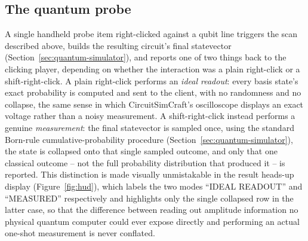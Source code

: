 \subsection{The quantum probe}

A single handheld probe item right-clicked against a qubit line triggers the scan described
above, builds the resulting circuit's final statevector (Section~\ref{sec:quantum-simulator}),
and reports one of two things back to the clicking player, depending on whether the
interaction was a plain right-click or a shift-right-click. A plain right-click performs an
\emph{ideal readout}: every basis state's exact probability is computed and sent to the
client, with no randomness and no collapse, the same sense in which CircuitSimCraft's
oscilloscope displays an exact voltage rather than a noisy measurement. A shift-right-click
instead performs a genuine \emph{measurement}: the final statevector is sampled once, using
the standard Born-rule cumulative-probability procedure (Section~\ref{sec:quantum-simulator}),
the state is collapsed onto that single sampled outcome, and only that one classical outcome
-- not the full probability distribution that produced it -- is reported. This distinction is
made visually unmistakable in the result heads-up display (Figure~\ref{fig:hud}), which
labels the two modes ``IDEAL READOUT'' and ``MEASURED'' respectively and highlights only the
single collapsed row in the latter case, so that the difference between reading out amplitude
information no physical quantum computer could ever expose directly and performing an actual
one-shot measurement is never conflated.
